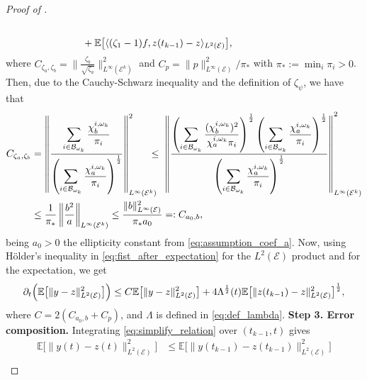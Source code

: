 \documentclass[a4paper, 10pt, english]{article}
\begin{document}
\begin{proof}[Proof of  ]
\begin{align}
\\
&\hspace{-1.9cm}\quad
+
\mathbb{E}\bigl[\langle (\zeta_1 - 1)f,z(t_{k-1}) - z\rangle_{L^2(\mathcal{E})}\bigr],
\end{align}
where $C_{\zeta_a,\zeta_b} = \bigl\|\tfrac{\zeta_b}{\sqrt{\zeta_a}}\bigr\|_{L^\infty(\mathcal{E}^k)}^2$ and $C_p = \|p\|_{L^\infty(\mathcal{E})}^2/\pi_\ast$ with $\pi_\ast:=\min_i\pi_i>0$. Then, due to the Cauchy-Schwarz inequality and the definition of $\zeta_\psi$, we have that
\begin{align*}
C_{\zeta_a,\zeta_b} &= \left\| \frac{\displaystyle\sum_{i\in \mathcal{B}_{\omega_k}}{ \frac{\chi^{i,\omega_k}_b}{\pi_i}}}{\left(\displaystyle\sum_{i\in \mathcal{B}_{\omega_k}}{ \frac{\chi^{i,\omega_k}_a}{\pi_i}}\right)^{\frac{1}{2}}}\right\|_{L^\infty(\mathcal{E}^k)}^2\hspace{-0.3cm}\leq \hspace{0.1cm} \left\| \frac{\left(\displaystyle\sum_{i\in \mathcal{B}_{\omega_k}}{ \frac{(\chi^{i,\omega_k}_b)^2}{\chi^{i,\omega_k}_a\pi_i}}\right)^{\frac{1}{2}}\left(\displaystyle\sum_{i\in \mathcal{B}_{\omega_k}}{ \frac{\chi^{i,\omega_k}_a}{\pi_i}}\right)^{\frac{1}{2}}}{\left(\displaystyle\sum_{i\in \mathcal{B}_{\omega_k}}{ \frac{\chi^{i,\omega_k}_a}{\pi_i}}\right)^{\frac{1}{2}}}\right\|_{L^\infty(\mathcal{E}^k)}^2\\
&\leq \frac{1}{\pi_\ast}\left\|\frac{b^2}{a} \right\|_{L^\infty(\mathcal{E}^k)}\leq \frac{\|b\|_{L^\infty(\mathcal{E})}^2}{\pi_\ast a_0}=: C_{a_0,b},
\end{align*}
being $a_0>0$ the ellipticity constant from \eqref{eq:assumption_coef_a}. Now, using Hölder’s inequality in \eqref{eq:fist_after_expectation} for the $L^2(\mathcal{E})$ product and for the expectation, we get
\begin{align}\label{eq:simplify_relation}
\partial_t \Bigl(\mathbb{E}\bigl[\|y - z\|_{L^2(\mathcal{E})}^2\bigr]\Bigr)
\le
C\mathbb{E}\bigl[\|y - z\|_{L^2(\mathcal{E})}^2\bigr]
+
4\Lambda^{\frac{1}{2}}(t)\mathbb{E}\bigl[\|z(t_{k-1}) - z\|_{L^2(\mathcal{E})}^2\bigr]^{\frac{1}{2}},
\end{align}
where $C = 2(C_{a_0,b} + C_p)$, and $\Lambda$ is defined in \eqref{eq:def_lambda}. 
\smallbreak
\noindent
{\bf Step 3. Error composition.}  Integrating \eqref{eq:simplify_relation} over $(t_{k-1}, t)$ gives
\begin{align}\label{eq:ine_from_k}
\nonumber
\mathbb{E}\bigl[\|y(t) - z(t)\|_{L^2(\mathcal{E})}^2\bigr]&
\le
\mathbb{E}\bigl[\|y(t_{k-1}) - z(t_{k-1})\|_{L^2(\mathcal{E})}^2\bigr]\\

\end{align}
\end{proof}
\end{document}
